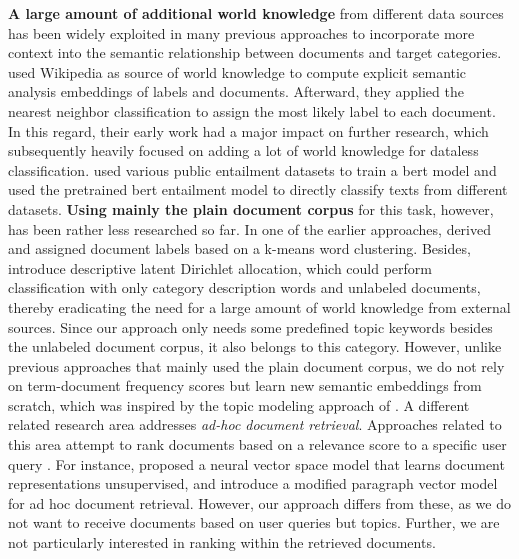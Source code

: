 \documentclass[a4paper,twoside]{article}
\begin{document}
\newline \textbf{A large amount of additional world knowledge} from different data sources has been widely exploited in many previous approaches to incorporate more context into the semantic relationship between documents and target categories. \citet{Chang2008ImportanceOS} used Wikipedia as source of world knowledge to compute explicit semantic analysis embeddings \citep{gabrilovich2007} of labels and documents. Afterward, they applied the nearest neighbor classification to assign the most likely label to each document. In this regard, their early work had a major impact on further research, which subsequently heavily focused on adding a lot of world knowledge for dataless classification. \citet{yin-etal-2019-benchmarking} used various public entailment datasets to train a \ac{bert} model \citep{devlin-etal-2019-bert} and used the pretrained \ac{bert} entailment model to directly classify texts from different datasets.\newline 
\newline \textbf{Using mainly the plain document corpus} for this task, however, has been rather less researched so far. In one of the earlier approaches, \citet{RaoPK06} derived and assigned document labels based on a k-means word clustering. Besides, \citet{Chen2015DatalessTC} introduce descriptive latent Dirichlet allocation, which could perform classification with only category description words and unlabeled documents, thereby eradicating the need for a large amount of world knowledge from external sources. Since our approach only needs some predefined topic keywords besides the unlabeled document corpus, it also belongs to this category. However, unlike previous approaches that mainly used the plain document corpus, we do not rely on term-document frequency scores but learn new semantic embeddings from scratch, which was inspired by the topic modeling approach of \citet{angelov2020top2vec}.\newline 
\newline
A different related research area addresses \textit{ad-hoc document retrieval}. Approaches related to this area attempt to rank documents based on a relevance score to a specific user query \citep{baeza1999modern}. For instance, \citet{NVSM2018} proposed a neural vector space model that learns document representations unsupervised, and \citet{PV_Ad-hoc_Retrieval2016} introduce a modified paragraph vector model for ad hoc document retrieval. However, our approach differs from these, as we do not want to receive documents based on user queries but topics. Further, we are not particularly interested in ranking within the retrieved documents.
\end{document}
